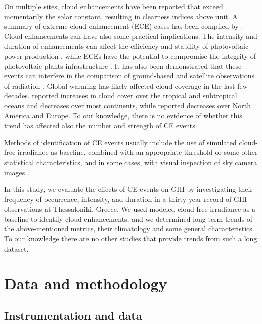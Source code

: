 \documentclass[preprint, 5p,
authoryear]{elsarticle} %
\begin{document}
On multiple sites, cloud enhancements have been reported that exceed
momentarily the solar constant, resulting in clearness indices above
unit. A summary of extreme cloud enhancement (ECE) cases has been
compiled by \citet{Martins2022}. Cloud enhancements can have also some
practical implications. The intensity and duration of enhancements can
affect the efficiency and stability of photovoltaic power production
\citep{Lappalainen2020, Jaervelae2020}, while ECEs have the potential to
compromise the integrity of photovoltaic plants infrastructure
\citep{DoNascimento2019}. It has also been demonstrated that these
events can interfere in the comparison of ground-based and satellite
observations of radiation \citep{Damiani2018}. Global warming has likely
affected cloud coverage in the last few decades. \citet{Liu2023}
reported increases in cloud cover over the tropical and subtropical
oceans and decreases over most continents, while \citet{Dong2023}
reported decreases over North America and Europe. To our knowledge,
there is no evidence of whether this trend has affected also the number
and strength of CE events.

Methods of identification of CE events usually include the use of
simulated cloud-free irradiance as baseline, combined with an
appropriate threshold or some other statistical characteristics, and in
some cases, with visual inspection of sky camera images \citep[ and
references therein]{Vamvakas2020, Mol2023}.

In this study, we evaluate the effects of CE events on GHI by
investigating their frequency of occurrence, intensity, and duration in
a thirty-year record of GHI observations at Thessaloniki, Greece. We
used modeled cloud-free irradiance as a baseline to identify cloud
enhancements, and we determined long-term trends of the above-mentioned
metrics, their climatology and some general characteristics. To our
knowledge there are no other studies that provide trends from such a
long dataset.

\hypertarget{data-and-methodology}{%
\section{Data and methodology}\label{data-and-methodology}}

\hypertarget{instrumentation-and-data}{%
\subsection{Instrumentation and data}\label{instrumentation-and-data}}
\end{document}
